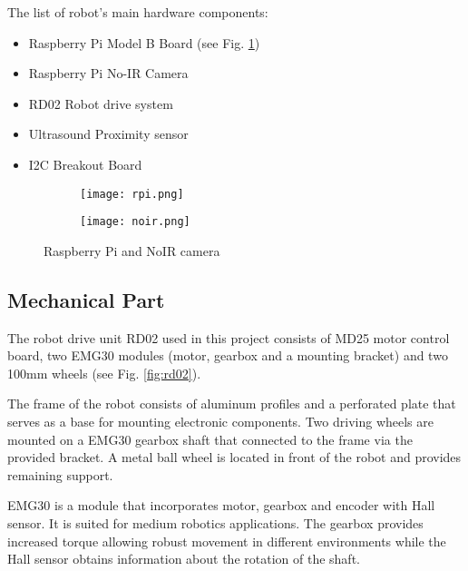 The list of robot's main hardware components:

\begin{itemize}
  \item Raspberry Pi Model B Board (see Fig. \ref{fig:rpi_board})
  \item Raspberry Pi No-IR Camera
  \item RD02 Robot drive system
  \item Ultrasound Proximity sensor
  \item I2C Breakout Board
\end{itemize}

\begin{figure}[h!]
\centering 

	\begin{subfigure}[h]{0.45\textwidth}
		\centering
			\texttt{[image: rpi.png]}
			\label{fig:rpi_board}
	\end{subfigure}
	\begin{subfigure}[h]{0.45\textwidth}
		\centering
			\texttt{[image: noir.png]}
			\label{fig:rpi_noir}
	\end{subfigure}

\caption{Raspberry Pi and NoIR camera}
\label{fig:rpi}
\end{figure}

\subsection*{Mechanical Part} 

The robot drive unit RD02 used in this project consists of MD25 motor control
board, two EMG30 modules (motor, gearbox and a mounting bracket) and two 100mm
wheels (see Fig. \ref{fig:rd02}).

The frame of the robot consists of aluminum profiles and a perforated plate that
serves as a base for mounting electronic components. Two driving wheels
are mounted on a EMG30 gearbox shaft that connected to the frame via the
provided bracket. A metal ball wheel is located in front of the robot and
provides remaining support.

EMG30 is a module that incorporates motor, gearbox and encoder with Hall sensor.
It is suited for medium robotics applications. The gearbox provides increased
torque allowing robust movement in different environments while the Hall sensor
obtains information about the rotation of the shaft.

